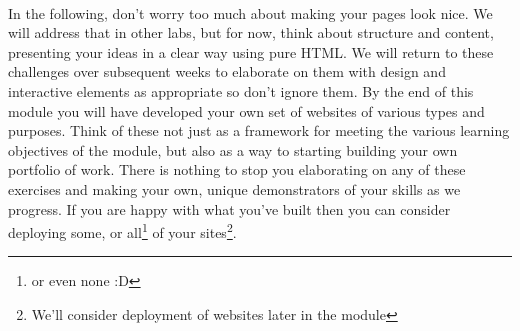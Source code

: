 \documentclass[10pt, a4paper]{article}
\begin{document}
\paragraph{} In the following, don't worry too much about making your pages look nice. We will address that in other labs, but for now, think about structure and content, presenting your ideas in a clear way using pure HTML. We will return to these challenges over subsequent weeks to elaborate on them with design and interactive elements as appropriate so don't ignore them. By the end of this module you will have developed your own set of websites of various types and purposes. Think of these not just as a framework for meeting the various learning objectives of the module, but also as a way to starting building your own portfolio of work. There is nothing to stop you elaborating on any of these exercises and making your own, unique demonstrators of your skills as we progress. If you are happy with what you've built then you can consider deploying some, or all\footnote{or even none :D} of your sites\footnote{We'll consider deployment of websites later in the module}.
\end{document}
